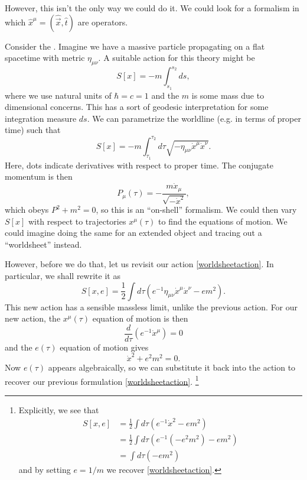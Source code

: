 However, this isn't the only way we could do it. We could look for a formalism in which $\hat x^\mu=(\hat{\vec x},\hat t)$ are operators.
\begin{exm}
    Consider the . Imagine we have a massive particle propagating on a flat spacetime with metric $\eta_{\mu\nu}$. A suitable action for this theory might be
    \begin{equation}\label{worldsheetaction}
        S[x]=- m\int_{s_1}^{s_2}ds,
    \end{equation}
    where we use natural units of $\hbar = c=1$ and the $m$ is some mass due to dimensional concerns. This has a sort of geodesic interpretation for some integration measure $ds$. We can parametrize the worldline (e.g. in terms of proper time) such that
    \begin{equation}
        S[x]=-m \int_{\tau_1}^{\tau_2} d\tau\sqrt{-\eta_{\mu\nu}\dot x^\mu \dot x^\nu}.
    \end{equation}
    Here, dots indicate derivatives with respect to proper time. The conjugate momentum is then
    \begin{equation}
        P_\mu (\tau)= -\frac{m\dot x_\mu}{\sqrt{-\dot x^2}},
    \end{equation}
    which obeys $P^2+m^2=0$, so this is an ``on-shell'' formalism. We could then vary $S[x]$ with respect to trajectories $x^\mu(\tau)$ to find the equations of motion. We could imagine doing the same for an extended object and tracing out a ``worldsheet'' instead.
    
    However, before we do that, let us revisit our action \ref{worldsheetaction}. In particular, we shall rewrite it as
    \begin{equation}\label{reparamaction}
        S[x,e]=\frac{1}{2}\int d\tau \left(e^{-1} \eta_{\mu\nu} \dot x^\mu \dot x^\nu-e m^2\right).
    \end{equation}
    This new action has a sensible massless limit, unlike the previous action. For our new action, the $x^\mu(\tau)$ equation of motion is then
    \begin{equation}\label{eomworldsheetxmu}
        \frac{d}{d\tau}(e^{-1}\dot x^\mu)=0
    \end{equation}
    and the $e(\tau)$ equation of motion gives
    \begin{equation}\label{eomworldsheete}
        \dot x^2 + e^2m^2=0.
    \end{equation}
    Now $e(\tau)$ appears algebraically, so we can substitute it back into the action to recover our previous formulation \ref{worldsheetaction}.%
        \footnote{Explicitly, we see that
        \begin{align*}
            S[x,e] &=\frac{1}{2}\int d\tau(e^{-1}\dot x^2 -em^2)\\
                &=\frac{1}{2}\int d\tau(e^{-1}(-e^2m^2) -em^2)\\
                &=\int d\tau (-em^2)
        \end{align*}
        and by setting $e=1/m$ we recover \ref{worldsheetaction}.}
    

\end{exm}

